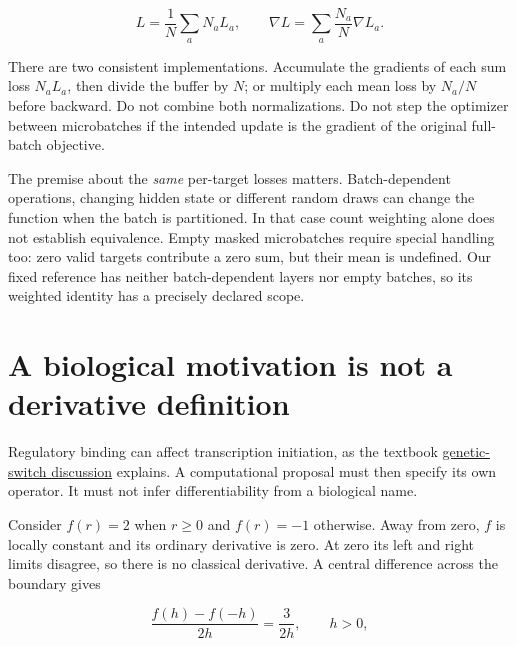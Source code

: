 \begin{equation}
L=\frac1N\sum_aN_aL_a,\qquad
\nabla L=\sum_a\frac{N_a}{N}\nabla L_a.
\end{equation}

There are two consistent implementations. Accumulate the gradients of
each sum loss \(N_aL_a\), then divide the buffer by \(N\); or multiply
each mean loss by \(N_a/N\) before backward. Do not combine both
normalizations. Do not step the optimizer between microbatches if the
intended update is the gradient of the original full-batch objective.

The premise about the \emph{same} per-target losses matters.
Batch-dependent operations, changing hidden state or different random
draws can change the function when the batch is partitioned. In that
case count weighting alone does not establish equivalence. Empty masked
microbatches require special handling too: zero valid targets contribute
a zero sum, but their mean is undefined. Our fixed reference has neither
batch-dependent layers nor empty batches, so its weighted identity has a
precisely declared scope.

\section{A biological motivation is not a derivative
definition}\label{a-biological-motivation-is-not-a-derivative-definition}

Regulatory binding can affect transcription initiation, as the textbook
\href{https://www.ncbi.nlm.nih.gov/books/NBK26872/}{genetic-switch
discussion} explains. A computational proposal must then specify its own
operator. It must not infer differentiability from a biological name.


Consider \(f(r)=2\) when \(r\ge0\) and \(f(r)=-1\) otherwise. Away from
zero, \(f\) is locally constant and its ordinary derivative is zero. At zero
its left and right limits disagree, so there is no classical derivative.
A central difference across the boundary gives

\begin{equation}
\frac{f(h)-f(-h)}{2h}=\frac{3}{2h},\qquad h>0,
\end{equation}

